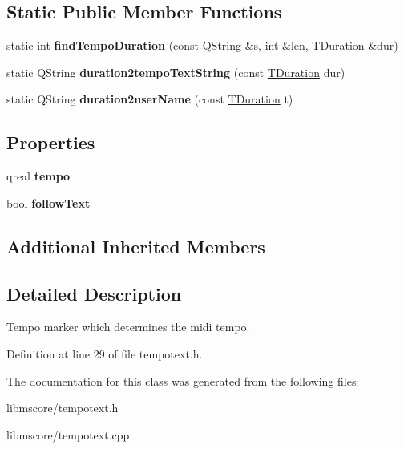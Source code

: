 \subsection*{Static Public Member Functions}
\begin{DoxyCompactItemize}
\item 
\mbox{\label{class_ms_1_1_tempo_text_ade4c33423b10f39a66d38d8930932d2a}} 
static int {\bfseries find\+Tempo\+Duration} (const Q\+String \&s, int \&len, \hyperlink{class_ms_1_1_t_duration}{T\+Duration} \&dur)
\item 
\mbox{\label{class_ms_1_1_tempo_text_a73c779d280f63588f247a329f83569d6}} 
static Q\+String {\bfseries duration2tempo\+Text\+String} (const \hyperlink{class_ms_1_1_t_duration}{T\+Duration} dur)
\item 
\mbox{\label{class_ms_1_1_tempo_text_a41521e5cc5b691e7342bed447ea1167c}} 
static Q\+String {\bfseries duration2user\+Name} (const \hyperlink{class_ms_1_1_t_duration}{T\+Duration} t)
\end{DoxyCompactItemize}
\subsection*{Properties}
\begin{DoxyCompactItemize}
\item 
\mbox{\label{class_ms_1_1_tempo_text_a21023261140d83e9b1474cb2ebe2a256}} 
qreal {\bfseries tempo}
\item 
\mbox{\label{class_ms_1_1_tempo_text_a3de7aa5f2f92a849edf0b5f3f78ef87f}} 
bool {\bfseries follow\+Text}
\end{DoxyCompactItemize}
\subsection*{Additional Inherited Members}


\subsection{Detailed Description}
Tempo marker which determines the midi tempo. 

Definition at line 29 of file tempotext.\+h.



The documentation for this class was generated from the following files\+:\begin{DoxyCompactItemize}
\item 
libmscore/tempotext.\+h\item 
libmscore/tempotext.\+cpp\end{DoxyCompactItemize}
